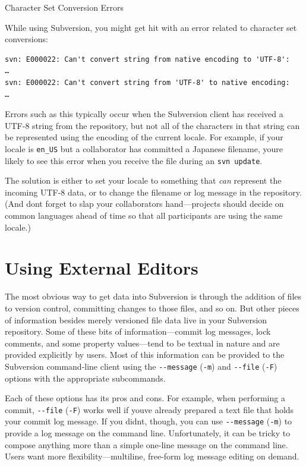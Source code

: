 Character Set Conversion Errors

While using Subversion, you might get hit with an error related to
character set conversions:

\begin{verbatim}
svn: E000022: Can't convert string from native encoding to 'UTF-8':
…
svn: E000022: Can't convert string from 'UTF-8' to native encoding:
…
\end{verbatim}

Errors such as this typically occur when the Subversion client has
received a UTF-8 string from the repository, but not all of the
characters in that string can be represented using the encoding of the
current locale. For example, if your locale is \texttt{en\_US} but a
collaborator has committed a Japanese filename, you\textquotesingle re
likely to see this error when you receive the file during an
\texttt{svn\ update}.

The solution is either to set your locale to something that \emph{can}
represent the incoming UTF-8 data, or to change the filename or log
message in the repository. (And don\textquotesingle t forget to slap
your collaborator\textquotesingle s hand---projects should decide on
common languages ahead of time so that all participants are using the
same locale.)

\section{Using External Editors}\label{svn.advanced.externaleditors}

The most obvious way to get data into Subversion is through the addition
of files to version control, committing changes to those files, and so
on. But other pieces of information besides merely versioned file data
live in your Subversion repository. Some of these bits of
information---commit log messages, lock comments, and some property
values---tend to be textual in nature and are provided explicitly by
users. Most of this information can be provided to the Subversion
command-line client using the \texttt{-\/-message} (\texttt{-m}) and
\texttt{-\/-file} (\texttt{-F}) options with the appropriate
subcommands.

Each of these options has its pros and cons. For example, when
performing a commit, \texttt{-\/-file} (\texttt{-F}) works well if
you\textquotesingle ve already prepared a text file that holds your
commit log message. If you didn\textquotesingle t, though, you can use
\texttt{-\/-message} (\texttt{-m}) to provide a log message on the
command line. Unfortunately, it can be tricky to compose anything more
than a simple one-line message on the command line. Users want more
flexibility---multiline, free-form log message editing on demand.

